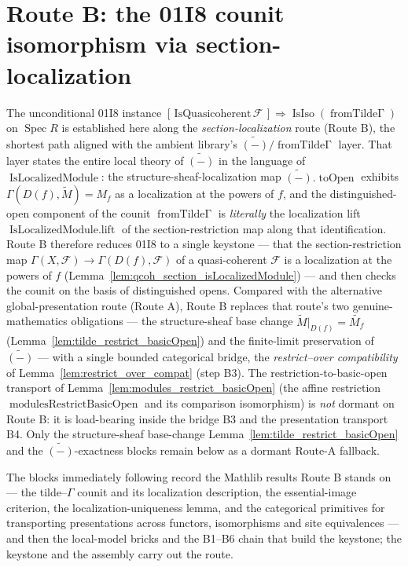 \section{Route B: the 01I8 counit isomorphism via section-localization}

The unconditional 01I8 instance \([{\,}\mathrm{IsQuasicoherent}\,\mathcal{F}{\,}] \Rightarrow
\operatorname{IsIso}(\operatorname{fromTilde\Gamma})\) on \(\operatorname{Spec} R\) is established here
along the \emph{section-localization} route (Route B), the shortest path aligned with the ambient
library's \(\widetilde{(-)} / \operatorname{fromTilde\Gamma}\) layer. That layer states the entire
local theory of \(\widetilde{(-)}\) in the language of \(\operatorname{IsLocalizedModule}\): the
structure-sheaf-localization map \(\widetilde{(-)}.\operatorname{toOpen}\) exhibits
\(\Gamma(D(f), \widetilde{M}) = M_f\) as a localization at the powers of \(f\), and the
distinguished-open component of the counit \(\operatorname{fromTilde\Gamma}\) is \emph{literally} the
localization lift \(\operatorname{IsLocalizedModule.lift}\) of the section-restriction map along that
identification. Route B therefore reduces 01I8 to a single keystone — that the section-restriction
map \(\Gamma(X, \mathcal{F}) \to \Gamma(D(f), \mathcal{F})\) of a quasi-coherent \(\mathcal{F}\) is a
localization at the powers of \(f\) (Lemma~\ref{lem:qcoh_section_isLocalizedModule}) — and then checks
the counit on the basis of distinguished opens. Compared with the alternative global-presentation
route (Route A), Route B replaces that route's two genuine-mathematics obligations — the
structure-sheaf base change \(\widetilde{M}|_{D(f)} = \widetilde{M_f}\)
(Lemma~\ref{lem:tilde_restrict_basicOpen}) and the finite-limit preservation of
\(\widetilde{(-)}\) — with a single bounded categorical bridge, the \emph{restrict--over
compatibility} of Lemma~\ref{lem:restrict_over_compat} (step B3). The restriction-to-basic-open
transport of Lemma~\ref{lem:modules_restrict_basicOpen} (the affine restriction
\(\operatorname{modulesRestrictBasicOpen}\) and its comparison isomorphism) is \emph{not} dormant on
Route B: it is load-bearing inside the bridge B3 and the presentation transport B4. Only the
structure-sheaf base-change Lemma~\ref{lem:tilde_restrict_basicOpen} and the
\(\widetilde{(-)}\)-exactness blocks remain below as a dormant Route-A fallback.

The blocks immediately following record the Mathlib results Route B stands on — the tilde--\(\Gamma\)
counit and its localization description, the essential-image criterion, the
localization-uniqueness lemma, and the categorical primitives for transporting presentations across
functors, isomorphisms and site equivalences — and then the local-model bricks and the B1--B6 chain
that build the keystone; the keystone and the assembly carry out the route.

